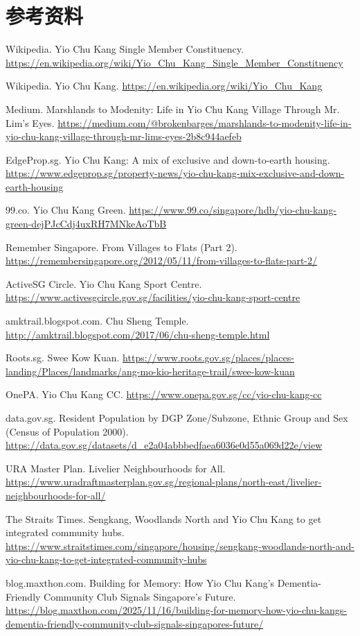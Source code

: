 \documentclass[11pt,a4paper,twoside,openany]{book}
\begin{document}
\section*{参考资料}
\begin{enumerate}[label={[\arabic*]},leftmargin=*,topsep=2pt,itemsep=1pt,parsep=0pt]
  \item Wikipedia. Yio Chu Kang Single Member Constituency. \url{https://en.wikipedia.org/wiki/Yio_Chu_Kang_Single_Member_Constituency}
  \item Wikipedia. Yio Chu Kang. \url{https://en.wikipedia.org/wiki/Yio_Chu_Kang}
  \item Medium. Marshlands to Modenity: Life in Yio Chu Kang Village Through Mr. Lim’s Eyes. \url{https://medium.com/@brokenbarges/marshlands-to-modenity-life-in-yio-chu-kang-village-through-mr-lims-eyes-2b8c944aefeb}
  \item EdgeProp.sg. Yio Chu Kang: A mix of exclusive and down-to-earth housing. \url{https://www.edgeprop.sg/property-news/yio-chu-kang-mix-exclusive-and-down-earth-housing}
  \item 99.co. Yio Chu Kang Green. \url{https://www.99.co/singapore/hdb/yio-chu-kang-green-dejPJcCdj4uxRH7MNkeAoTbB}
  \item Remember Singapore. From Villages to Flats (Part 2). \url{https://remembersingapore.org/2012/05/11/from-villages-to-flats-part-2/}
  \item ActiveSG Circle. Yio Chu Kang Sport Centre. \url{https://www.activesgcircle.gov.sg/facilities/yio-chu-kang-sport-centre}
  \item amktrail.blogspot.com. Chu Sheng Temple. \url{http://amktrail.blogspot.com/2017/06/chu-sheng-temple.html}
  \item Roots.sg. Swee Kow Kuan. \url{https://www.roots.gov.sg/places/places-landing/Places/landmarks/ang-mo-kio-heritage-trail/swee-kow-kuan}
  \item OnePA. Yio Chu Kang CC. \url{https://www.onepa.gov.sg/cc/yio-chu-kang-cc}
  \item data.gov.sg. Resident Population by DGP Zone/Subzone, Ethnic Group and Sex (Census of Population 2000). \url{https://data.gov.sg/datasets/d_e2a04abbbedfaea6036e0d55a069d22e/view}
  \item URA Master Plan. Livelier Neighbourhoods for All. \url{https://www.uradraftmasterplan.gov.sg/regional-plans/north-east/livelier-neighbourhoods-for-all/}
  \item The Straits Times. Sengkang, Woodlands North and Yio Chu Kang to get integrated community hubs. \url{https://www.straitstimes.com/singapore/housing/sengkang-woodlands-north-and-yio-chu-kang-to-get-integrated-community-hubs}
  \item blog.maxthon.com. Building for Memory: How Yio Chu Kang’s Dementia-Friendly Community Club Signals Singapore’s Future. \url{https://blog.maxthon.com/2025/11/16/building-for-memory-how-yio-chu-kangs-dementia-friendly-community-club-signals-singapores-future/}
\end{enumerate}
\end{document}
